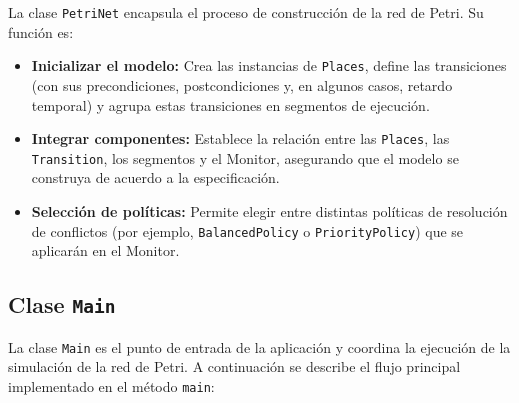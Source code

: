 \documentclass[12pt]{article}
\begin{document}
La clase \texttt{PetriNet} encapsula el proceso de construcción de la red de Petri. Su función es:
\begin{itemize}
    \item \textbf{Inicializar el modelo:} Crea las instancias de \texttt{Places}, define las transiciones (con sus precondiciones, postcondiciones y, en algunos casos, retardo temporal) y agrupa estas transiciones en segmentos de ejecución.
    \item \textbf{Integrar componentes:} Establece la relación entre las \texttt{Places}, las \texttt{Transition}, los segmentos y el Monitor, asegurando que el modelo se construya de acuerdo a la especificación.
    \item \textbf{Selección de políticas:} Permite elegir entre distintas políticas de resolución de conflictos (por ejemplo, \texttt{BalancedPolicy} o \texttt{PriorityPolicy}) que se aplicarán en el Monitor.
\end{itemize}
\subsection{Clase \texttt{Main}}

La clase \texttt{Main} es el punto de entrada de la aplicación y coordina la ejecución de la simulación de la red de Petri. A continuación se describe el flujo principal implementado en el método \texttt{main}:
\end{document}
